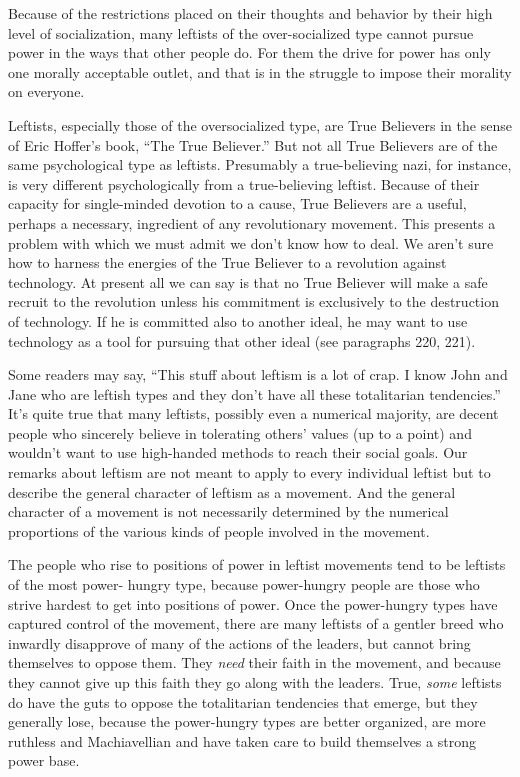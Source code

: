  Because of the restrictions placed on their thoughts and behavior by their high level of socialization, many leftists of the over-socialized type cannot pursue power in the ways that other people do. For them the drive for power has only one morally acceptable outlet, and that is in the struggle to impose their morality on everyone.

 Leftists, especially those of the oversocialized type, are True Believers in the sense of Eric Hoffer’s book, “The True Believer.” But not all True Believers are of the same psychological type as leftists. Presumably a true-believing nazi, for instance, is very different psychologically from a true-believing leftist. Because of their capacity for single-minded devotion to a cause, True Believers are a useful, perhaps a necessary, ingredient of any revolutionary movement. This presents a problem with which we must admit we don’t know how to deal. We aren’t sure how to harness the energies of the True Believer to a revolution against technology. At present all we can say is that no True Believer will make a safe recruit to the revolution unless his commitment is exclusively to the destruction of technology. If he is committed also to another ideal, he may want to use technology as a tool for pursuing that other ideal (see paragraphs 220, 221).

 Some readers may say, “This stuff about leftism is a lot of crap. I know John and Jane who are leftish types and they don’t have all these totalitarian tendencies.” It’s quite true that many leftists, possibly even a numerical majority, are decent people who sincerely believe in tolerating others’ values (up to a point) and wouldn’t want to use high-handed methods to reach their social goals. Our remarks about leftism are not meant to apply to every individual leftist but to describe the general character of leftism as a movement. And the general character of a movement is not necessarily determined by the numerical proportions of the various kinds of people involved in the movement.

 The people who rise to positions of power in leftist movements tend to be leftists of the most power- hungry type, because power-hungry people are those who strive hardest to get into positions of power. Once the power-hungry types have captured control of the movement, there are many leftists of a gentler breed who inwardly disapprove of many of the actions of the leaders, but cannot bring themselves to oppose them. They {\em need} their faith in the movement, and because they cannot give up this faith they go along with the leaders. True, {\em some} leftists do have the guts to oppose the totalitarian tendencies that emerge, but they generally lose, because the power-hungry types are better organized, are more ruthless and Machiavellian and have taken care to build themselves a strong power base.

